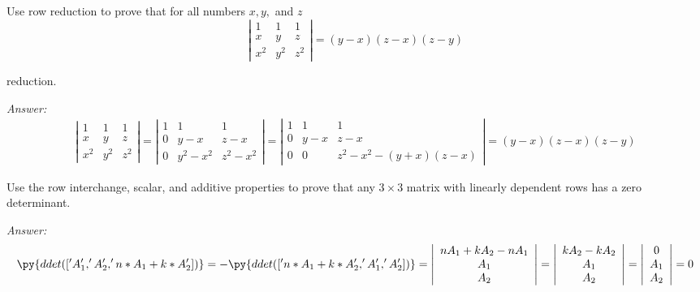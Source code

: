 \documentclass[letterpaper]{article}
\newcommand{\ans}{\textit{Answer: }}
\newenvironment{question}[2][Question]{\begin{trivlist}
\item[\hskip \labelsep {\bfseries #1}\hskip \labelsep {\bfseries #2.}]}{\end{trivlist}}
\begin{document}
\begin{question}{4.16}
  Use row reduction to prove that for all numbers $x, y,$ and $z$
  $$
  \left| \begin{array}{ccc}{1} & {1} & {1} \\ {x} & {y} & {z} \\ {x^{2}} & {y^{2}} & {z^{2}}\end{array}\right|=(y-x)(z-x)(z-y)
  $$

  reduction.

  \ans
  \begin{align*}
  \left| \begin{array}{ccc}{1} & {1} & {1} \\ {x} & {y} & {z} \\ {x^{2}} & {y^{2}} & {z^{2}}\end{array}\right|
  = \left| \begin{array}{ccc}{1} & {1} & {1} \\ {0} & {y-x} & {z-x} \\ {0} & {y^{2}-x^2} & {z^{2}-x^2}\end{array}\right|
  = \left| \begin{array}{ccc}{1} & {1} & {1} \\ {0} & {y-x} & {z-x} \\ {0} & {0} & {z^{2}-x^2-(y+x)(z-x)}\end{array}\right|
  = (y-x)(z-x)(z-y)
  \end{align*}
  
\end{question}

\begin{question}{4.18}
  Use the row interchange, scalar, and additive properties to prove that any
  $3 \times 3$ matrix with linearly dependent rows has a zero determinant.

  \ans 
  $$
  \py{ddet(['A_1', 'A_2', 'n*A_1 + k*A_2'])}
  = -\py{ddet(['n*A_1 + k*A_2', 'A_1', 'A_2'])}
  = \left| \begin{array}{c}{nA_1 + kA_2 - nA_1} \\ {A_1} \\ {A_2}\end{array}\right|
  = \left| \begin{array}{c}{kA_2 - kA_2} \\ {A_1} \\ {A_2}\end{array}\right|
  = \left| \begin{array}{c}{0} \\ {A_1} \\ {A_2}\end{array}\right|
  = 0
  $$
  
\end{question}
\end{document}
